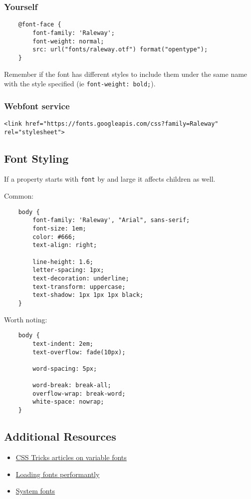 \subsubsection{Yourself}

\begin{verbatim}
    @font-face {
        font-family: 'Raleway';
        font-weight: normal;
        src: url("fonts/raleway.otf") format("opentype");
    }
\end{verbatim}

Remember if the font has different styles to include them under the same name with the style specified (ie \texttt{font-weight: bold;}).

\subsubsection{Webfont service}

\begin{verbatim}
<link href="https://fonts.googleapis.com/css?family=Raleway" rel="stylesheet">
\end{verbatim}

\subsection{Font Styling}

If a property starts with \texttt{font} by and large it affects children as well.

Common:

\begin{verbatim}
    body {
        font-family: 'Raleway', "Arial", sans-serif;
        font-size: 1em;
        color: #666;
        text-align: right;

        line-height: 1.6;
        letter-spacing: 1px;
        text-decoration: underline;
        text-transform: uppercase;
        text-shadow: 1px 1px 1px black;
    }
\end{verbatim}

Worth noting:

\begin{verbatim}
    body {
        text-indent: 2em;
        text-overflow: fade(10px);

        word-spacing: 5px;

        word-break: break-all;
        overflow-wrap: break-word;
        white-space: nowrap;
    }
\end{verbatim}

\subsection{Additional Resources}

\begin{itemize}[leftmargin=*]
    \item \href{https://css-tricks.com/guides/opentype-variable-fonts/}{CSS Tricks articles on variable fonts}
    \item \href{https://css-tricks.com/fout-foit-foft/}{Loading fonts performantly}
    \item \href{https://css-tricks.com/snippets/css/system-font-stack/}{System fonts}
\end{itemize}
